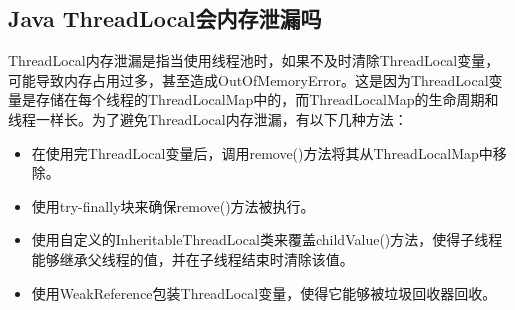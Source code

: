 \documentclass[../../../interview-questions.tex]{subfiles}
\begin{document}
\subsection{Java ThreadLocal会内存泄漏吗}

ThreadLocal内存泄漏是指当使用线程池时，如果不及时清除ThreadLocal变量，可能导致内存占用过多，甚至造成OutOfMemoryError。这是因为ThreadLocal变量是存储在每个线程的ThreadLocalMap中的，而ThreadLocalMap的生命周期和线程一样长。为了避免ThreadLocal内存泄漏，有以下几种方法：

\begin{itemize}
    \item {在使用完ThreadLocal变量后，调用remove()方法将其从ThreadLocalMap中移除。}
    \item {使用try-finally块来确保remove()方法被执行。}
    \item {使用自定义的InheritableThreadLocal类来覆盖childValue()方法，使得子线程能够继承父线程的值，并在子线程结束时清除该值。}
    \item {使用WeakReference包装ThreadLocal变量，使得它能够被垃圾回收器回收。}
\end{itemize}
\end{document}
